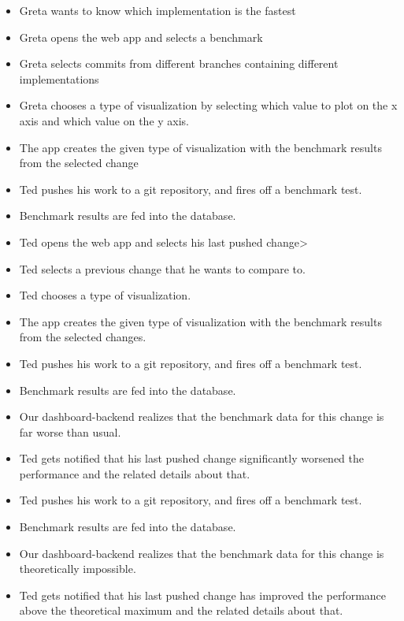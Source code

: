 \begin{itemize}
	\item Greta wants to know which implementation is the fastest
	\item Greta opens the web app and selects a benchmark
	\item Greta selects commits from different branches containing different implementations
	\item Greta chooses a type of \gls{visualization} by selecting which value to plot on the x axis and which value on the y axis.
	\item The app creates the given type of \gls{visualization} with the benchmark results from the selected change
\end{itemize}

\begin{itemize}
	\item Ted pushes his work to a git repository, and fires off a benchmark test.
	\item Benchmark results are fed into the database.
	\item Ted opens the web app and selects his last pushed change>
	\item Ted selects a previous change that he wants to compare to.
	\item Ted chooses a type of \gls{visualization}.
	\item The app creates the given type of \gls{visualization} with the benchmark results from the selected changes.
\end{itemize}

\begin{itemize}
	\item Ted pushes his work to a git repository, and fires off a benchmark test.
	\item Benchmark results are fed into the database.
	\item Our dashboard-backend realizes that the benchmark data for this change is far worse than usual.
	\item Ted gets notified that his last pushed change significantly worsened the performance and the related details about that.
\end{itemize}

\begin{itemize}
	\item Ted pushes his work to a git repository, and fires off a benchmark test.
	\item Benchmark results are fed into the database.
	\item Our dashboard-backend realizes that the benchmark data for this change is theoretically impossible.
	\item Ted gets notified that his last pushed change has improved the performance above the theoretical maximum and the related details about that.
\end{itemize}

